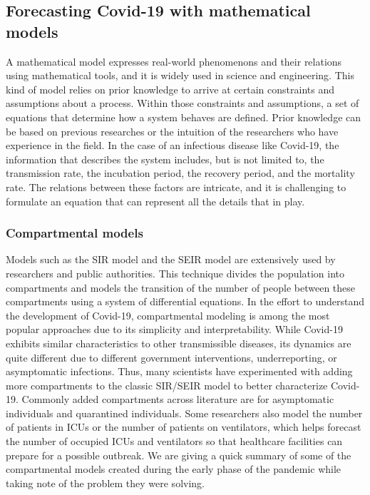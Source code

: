 \subsection{Forecasting Covid-19 with mathematical models}

A mathematical model expresses real-world phenomenons and their relations using mathematical tools, and it is widely used in science and engineering.
This kind of model relies on prior knowledge to arrive at certain constraints and assumptions about a process.
Within those constraints and assumptions, a set of equations that determine how a system behaves are defined.
Prior knowledge can be based on previous researches or the intuition of the researchers who have experience in the field.
In the case of an infectious disease like Covid-19, the information that describes the system includes, but is not limited to, the transmission rate, the incubation period, the recovery period, and the mortality rate.
The relations between these factors are intricate, and it is challenging to formulate an equation that can represent all the details that in play.

\subsubsection{Compartmental models}

Models such as the \gls{SIR} model and the \gls{SEIR} model \cite{kermackContributionMathematicalTheory1927, kermackContributionsMathematicalTheory1932, kermackContributionsMathematicalTheory1933, brauerCompartmentalModelsEpidemiology2008} are extensively used by researchers and public authorities.
This technique divides the population into compartments and models the transition of the number of people between these compartments using a system of differential equations.
In the effort to understand the development of Covid-19, compartmental modeling is among the most popular approaches due to its simplicity and interpretability.
While Covid-19 exhibits similar characteristics to other transmissible diseases, its dynamics are quite different due to different government interventions, underreporting, or asymptomatic infections.
Thus, many scientists have experimented with adding more compartments to the classic \gls{SIR}/\gls{SEIR} model to better characterize Covid-19.
Commonly added compartments across literature are for asymptomatic individuals and quarantined individuals.
Some researchers also model the number of patients in \glspl{ICU} or the number of patients on ventilators, which helps forecast the number of occupied \glspl{ICU} and ventilators so that healthcare facilities can prepare for a possible outbreak.
We are giving a quick summary of some of the compartmental models created during the early phase of the pandemic while taking note of the problem they were solving.

